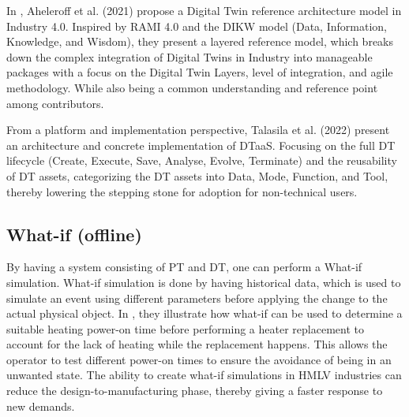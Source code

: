 In \cite{AHELEROFF2021101225}, Aheleroff et al. (2021) propose a Digital Twin reference architecture model in Industry 4.0.
Inspired by RAMI 4.0 and the DIKW model (Data, Information, Knowledge, and Wisdom), they present a layered reference model, which breaks down the complex integration of Digital Twins in Industry into manageable packages with a focus on the Digital Twin Layers, level of integration, and agile methodology. While also being a common understanding and reference point among contributors. 

From a platform and implementation perspective, Talasila et al. (2022) \cite{auDTaaS10448890} present an architecture and concrete implementation of DTaaS. Focusing on the full DT lifecycle (Create, Execute, Save, Analyse, Evolve, Terminate) and the reusability of DT assets, categorizing the DT assets into Data, Mode, Function, and Tool, thereby lowering the stepping stone for adoption for non-technical users. 

\subsection{What-if (offline)}
By having a system consisting of PT and DT, one can perform a What-if simulation. What-if simulation is done by having historical data, which is used to simulate an event using different parameters before applying the change to the actual physical object. In \cite{Frasheri2024}, they illustrate how what-if can be used to determine a suitable heating power-on time before performing a heater replacement to account for the lack of heating while the replacement happens. This allows the operator to test different power-on times to ensure the avoidance of being in an unwanted state. The ability to create what-if simulations in HMLV industries can reduce the design-to-manufacturing phase, thereby giving a faster response to new demands. 

